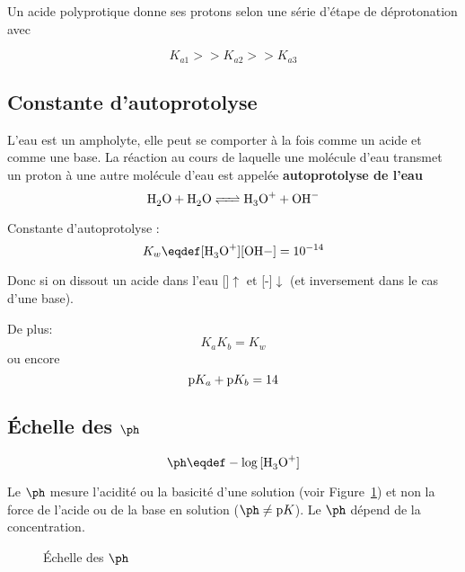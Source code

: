 Un acide polyprotique donne ses protons selon une série d'étape de déprotonation avec

\[ K_{a1} >> K_{a2} >> K_{a3} \]

\subsection{Constante d'autoprotolyse}
L'eau est un \textrm{ampholyte},
elle peut se comporter à la fois comme un acide et comme une base.
La réaction au cours de laquelle une molécule d'eau transmet un proton à une autre molécule d'eau est appelée \textbf{autoprotolyse de l'eau}
\[\ce{H2O + H2O <=> H3O+ + OH-}\]

Constante d'autoprotolyse :
\[ K_w\eqdef[\ce{H3O+}][\ce{OH}-]=10^{-14} \]

Donc si on dissout un acide dans l'eau []$\uparrow$ et [-]$\downarrow$ (et inversement dans le cas d'une base).

De plus:
\[ K_aK_b=K_w \]
ou encore
\[ \mathrm{p}K_a+\mathrm{p}K_b=14 \]

\subsection{\'Echelle des $\ph$}

$$\ph\eqdef-\log{[\ce{H3O+}]}$$

Le $\ph$ mesure l'acidité ou la basicité d'une solution (voir Figure~\ref{fig:ph_scale}) et non la force de l'acide ou de la base en solution ($\ph \neq \mathrm{p}K$).
Le $\ph$ dépend de la concentration.
\begin{figure}[ht!]
  \begin{center}
  \end{center}
  \caption{Échelle des $\ph$}
  \label{fig:ph_scale}
\end{figure}

